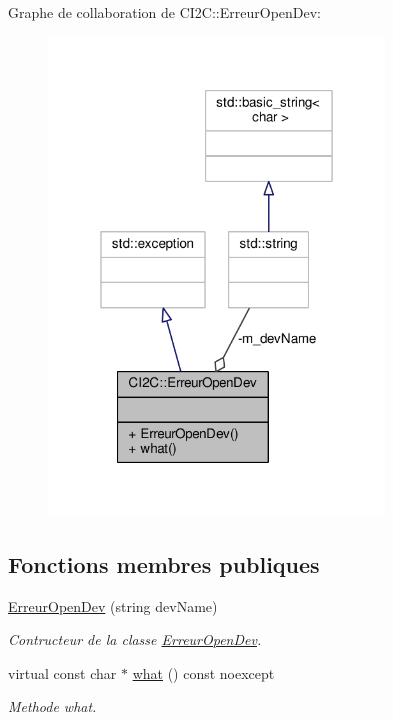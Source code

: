 Graphe de collaboration de C\+I2\+C\+:\+:Erreur\+Open\+Dev\+:\nopagebreak
\begin{figure}[H]
\begin{center}
\leavevmode
\includegraphics[width=253pt]{classCI2C_1_1ErreurOpenDev__coll__graph}
\end{center}
\end{figure}
\subsection*{Fonctions membres publiques}
\begin{DoxyCompactItemize}
\item 
\hyperlink{classCI2C_1_1ErreurOpenDev_ac741480179a06b9d23f4c5c49500a5e1}{Erreur\+Open\+Dev} (string dev\+Name)
\begin{DoxyCompactList}\small\item\em Contructeur de la classe \hyperlink{classCI2C_1_1ErreurOpenDev}{Erreur\+Open\+Dev}. \end{DoxyCompactList}\item 
virtual const char $\ast$ \hyperlink{classCI2C_1_1ErreurOpenDev_a52441e7b0de2a74dd51c67504bb93fe1}{what} () const noexcept
\begin{DoxyCompactList}\small\item\em Methode what. \end{DoxyCompactList}\end{DoxyCompactItemize}
